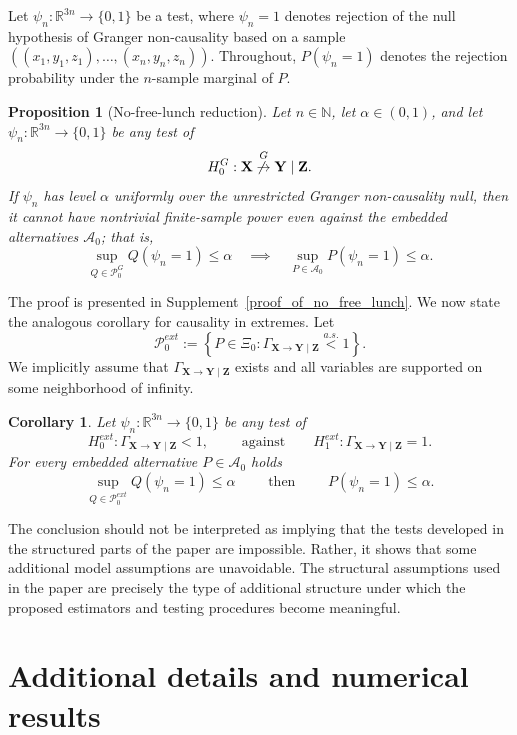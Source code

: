 \documentclass[a4paper,11pt]{article}
\newtheorem{proposition}{Proposition}
\newtheorem{corollary}{Corollary}
\newcommand{\toverset}[2]{\overset{{\rm #1}}{#2}}
\begin{document}
Let \(
    \psi_n:\mathbb R^{3n}\to\{0,1\}
\) be a test, where \(\psi_n=1\) denotes rejection of the null hypothesis of
Granger non-causality based on a sample $((x_1, y_1, z_1), \dots, (x_n, y_n, z_n))$. Throughout, \(P(\psi_n=1)\) denotes the rejection probability under the \(n\)-sample marginal of \(P\).

\begin{proposition}[No-free-lunch reduction]
\label{no_free_lunch}
Let \(n\in\mathbb N\), let \(\alpha\in(0,1)\), and let
\(\psi_n:\mathbb R^{3n}\to\{0,1\}\) be any test of
\[
    H_0^G:\mathbf X\toverset{G}{\not\to}\mathbf Y\mid\mathbf Z .
\]
If \(\psi_n\) has level \(\alpha\) uniformly over the unrestricted Granger non-causality null, then it cannot have nontrivial finite-sample power even against the embedded alternatives \(\mathcal A_0\); that is, 
\[
    \sup_{Q\in\mathcal P_0^G} Q(\psi_n=1)\le \alpha  \quad \implies \quad       \sup_{P\in\mathcal A_0}   P(\psi_n=1)\le \alpha. 
\]
\end{proposition}

The proof is presented in Supplement~\ref{proof_of_no_free_lunch}. We now state the analogous corollary for causality in extremes. Let
\[
    \mathcal P_0^{ext}
    :=
    \left\{
        P\in\Xi_0:
        \Gamma_{\mathbf X\to\mathbf Y\mid\mathbf Z}\overset{a.s.}{<}1
    \right\}.
\]
We implicitly assume that \(\Gamma_{\mathbf X\to\mathbf Y\mid\mathbf Z}\) exists and all variables are supported on some neighborhood of infinity. 

\begin{corollary}
\label{corollary_no_free_lunch}
Let \(\psi_n:\mathbb R^{3n}\to\{0,1\}\) be any test of
\[
    H_0^{ext}:
    \Gamma_{\mathbf X\to\mathbf Y\mid\mathbf Z}<1, \qquad \text{ against} \qquad 
    H_1^{ext}:
    \Gamma_{\mathbf X\to\mathbf Y\mid\mathbf Z}=1.
\]
For every embedded alternative \(P\in\mathcal A_0\) holds 
\[
\sup_{Q\in\mathcal P_0^{ext}}Q(\psi_n=1)\le \alpha \qquad 
\text{ then } \qquad 
    P(\psi_n=1)\le \alpha. 
\]
\end{corollary}

The conclusion should not be interpreted as implying that the tests developed in the
structured parts of the paper are impossible. Rather, it shows that some
additional model assumptions are unavoidable. The structural
assumptions used in the paper are precisely the type of additional structure under which the
proposed estimators and testing procedures become meaningful.

\newpage
\section{Additional details and numerical results}
\label{appendix_all_simulations}
\end{document}
